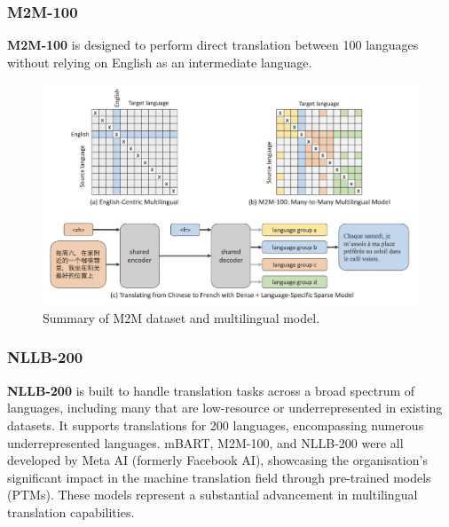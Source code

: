 \documentclass[a4paper]{article}
\begin{document}
\subsubsection{M2M-100}

\textbf{M2M-100} \cite{fan-2020-m2m100} is designed to perform direct translation between 100 languages without relying on English as an intermediate language.


\begin{figure}[htbp]
    \centering
    \includegraphics[width=0.9\linewidth]{images/m2m.png}
    \caption{Summary of M2M dataset and multilingual model.}
    \label{fig:m2m}
\end{figure}



\subsubsection{NLLB-200}

\textbf{NLLB-200} \cite{nllb200-2020} is built to handle translation tasks across a broad spectrum of languages, including many that are low-resource or underrepresented in existing datasets. It supports translations for 200 languages, encompassing numerous underrepresented languages. mBART, M2M-100, and NLLB-200 were all developed by Meta AI (formerly Facebook AI), showcasing the organisation's significant impact in the machine translation field through pre-trained models (PTMs). These models represent a substantial advancement in multilingual translation capabilities.
\end{document}
